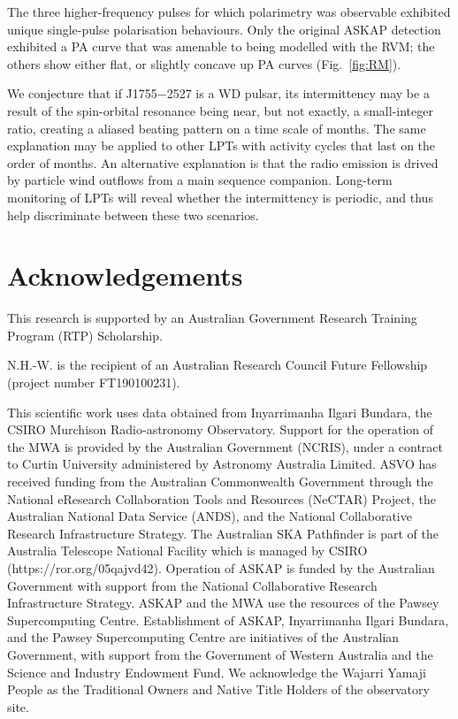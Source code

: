 \documentclass[fleqn,usenatbib]{mnras}
\newcommand{\src}{J1755$-$2527}
\newcommand{\Fig}{Fig.}
\begin{document}
The three higher-frequency pulses for which polarimetry was observable exhibited unique single-pulse polarisation behaviours.
Only the original ASKAP detection exhibited a PA curve that was amenable to being modelled with the RVM; the others show either flat, or slightly concave up PA curves (\Fig~\ref{fig:RM}).

We conjecture that if \src{} is a WD pulsar, its intermittency may be a result of the spin-orbital resonance being near, but not exactly, a small-integer ratio, creating a aliased beating pattern on a time scale of months.
The same explanation may be applied to other LPTs with activity cycles that last on the order of months.
An alternative explanation is that the radio emission is drived by particle wind outflows from a main sequence companion.
Long-term monitoring of LPTs will reveal whether the intermittency is periodic, and thus help discriminate between these two scenarios.

\section*{Acknowledgements}

This research is supported by an Australian Government Research Training Program (RTP) Scholarship.

N.H.-W. is the recipient of an Australian Research Council Future Fellowship (project number FT190100231).
 
This scientific work uses data obtained from Inyarrimanha Ilgari Bundara, the CSIRO Murchison Radio-astronomy Observatory. Support for the operation of the MWA is provided by the Australian Government (NCRIS), under a contract to Curtin University administered by Astronomy Australia Limited. ASVO has received funding from the Australian Commonwealth Government through the National eResearch Collaboration Tools and Resources (NeCTAR) Project, the Australian National Data Service (ANDS), and the National Collaborative Research Infrastructure Strategy.
The Australian SKA Pathfinder is part of the Australia Telescope National Facility which is managed by CSIRO (https://ror.org/05qajvd42). Operation of ASKAP is funded by the Australian Government with support from the National Collaborative Research Infrastructure Strategy. ASKAP and the MWA use the resources of the Pawsey Supercomputing Centre. Establishment of ASKAP, Inyarrimanha Ilgari Bundara, and the Pawsey Supercomputing Centre are initiatives of the Australian Government, with support from the Government of Western Australia and the Science and Industry Endowment Fund. We acknowledge the Wajarri Yamaji People as the Traditional Owners and Native Title Holders of the observatory site.
\end{document}
